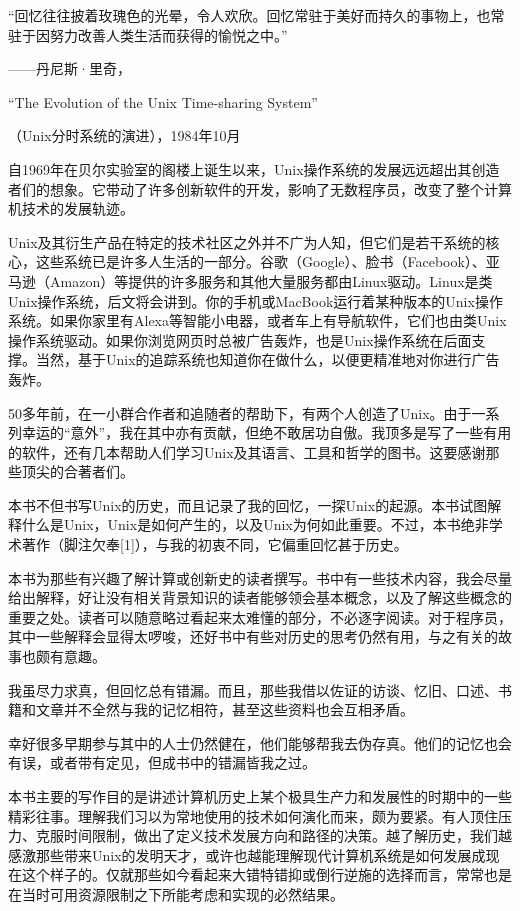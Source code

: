 \documentclass[a4paper,12pt,UTF8,twoside]{ctexbook}
\begin{document}
“回忆往往披着玫瑰色的光晕，令人欢欣。回忆常驻于美好而持久的事物上，也常驻于因努力改善人类生活而获得的愉悦之中。”

——丹尼斯·里奇，

“The Evolution of the Unix Time-sharing System”

（Unix分时系统的演进），1984年10月

自1969年在贝尔实验室的阁楼上诞生以来，Unix操作系统的发展远远超出其创造者们的想象。它带动了许多创新软件的开发，影响了无数程序员，改变了整个计算机技术的发展轨迹。

Unix及其衍生产品在特定的技术社区之外并不广为人知，但它们是若干系统的核心，这些系统已是许多人生活的一部分。谷歌（Google）、脸书（Facebook）、亚马逊（Amazon）等提供的许多服务和其他大量服务都由Linux驱动。Linux是类Unix操作系统，后文将会讲到。你的手机或MacBook运行着某种版本的Unix操作系统。如果你家里有Alexa等智能小电器，或者车上有导航软件，它们也由类Unix操作系统驱动。如果你浏览网页时总被广告轰炸，也是Unix操作系统在后面支撑。当然，基于Unix的追踪系统也知道你在做什么，以便更精准地对你进行广告轰炸。

50多年前，在一小群合作者和追随者的帮助下，有两个人创造了Unix。由于一系列幸运的“意外”，我在其中亦有贡献，但绝不敢居功自傲。我顶多是写了一些有用的软件，还有几本帮助人们学习Unix及其语言、工具和哲学的图书。这要感谢那些顶尖的合著者们。

本书不但书写Unix的历史，而且记录了我的回忆，一探Unix的起源。本书试图解释什么是Unix，Unix是如何产生的，以及Unix为何如此重要。不过，本书绝非学术著作（脚注欠奉[1]），与我的初衷不同，它偏重回忆甚于历史。

本书为那些有兴趣了解计算或创新史的读者撰写。书中有一些技术内容，我会尽量给出解释，好让没有相关背景知识的读者能够领会基本概念，以及了解这些概念的重要之处。读者可以随意略过看起来太难懂的部分，不必逐字阅读。对于程序员，其中一些解释会显得太啰唆，还好书中有些对历史的思考仍然有用，与之有关的故事也颇有意趣。

我虽尽力求真，但回忆总有错漏。而且，那些我借以佐证的访谈、忆旧、口述、书籍和文章并不全然与我的记忆相符，甚至这些资料也会互相矛盾。

幸好很多早期参与其中的人士仍然健在，他们能够帮我去伪存真。他们的记忆也会有误，或者带有定见，但成书中的错漏皆我之过。

本书主要的写作目的是讲述计算机历史上某个极具生产力和发展性的时期中的一些精彩往事。理解我们习以为常地使用的技术如何演化而来，颇为要紧。有人顶住压力、克服时间限制，做出了定义技术发展方向和路径的决策。越了解历史，我们越感激那些带来Unix的发明天才，或许也越能理解现代计算机系统是如何发展成现在这个样子的。仅就那些如今看起来大错特错抑或倒行逆施的选择而言，常常也是在当时可用资源限制之下所能考虑和实现的必然结果。
\end{document}
